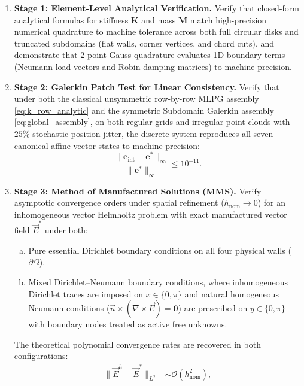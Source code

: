 \documentclass[preprint,12pt]{elsarticle}
\begin{document}
\begin{enumerate}
    \item \textbf{Stage 1: Element-Level Analytical Verification.} Verify that closed-form analytical formulas for stiffness $\mathbf{K}$ and mass $\mathbf{M}$ match high-precision numerical quadrature to machine tolerance across both full circular disks and truncated subdomains (flat walls, corner vertices, and chord cuts), and demonstrate that 2-point Gauss quadrature evaluates 1D boundary terms (Neumann load vectors and Robin damping matrices) to machine precision.
    \item \textbf{Stage 2: Galerkin Patch Test for Linear Consistency.} Verify that under both the classical unsymmetric row-by-row MLPG assembly \eqref{eq:k_row_analytic} and the symmetric Subdomain Galerkin assembly \eqref{eq:global_assembly}, on both regular grids and irregular point clouds with $25\%$ stochastic position jitter, the discrete system reproduces all seven canonical affine vector states to machine precision:
          \begin{equation}
              \frac{\|\mathbf{e}_{\mathrm{int}} - \mathbf{e}^*\|_{\infty}}{\|\mathbf{e}^*\|_{\infty}} \le 10^{-11}.
          \end{equation}
    \item \textbf{Stage 3: Method of Manufactured Solutions (MMS).} Verify asymptotic convergence orders under spatial refinement ($h_{\mathrm{nom}} \to 0$) for an inhomogeneous vector Helmholtz problem with exact manufactured vector field $\vec{E}^*$ under both:
          \begin{enumerate}[(a)]
              \item Pure essential Dirichlet boundary conditions on all four physical walls ($\partial\Omega$).
              \item Mixed Dirichlet--Neumann boundary conditions, where inhomogeneous Dirichlet traces are imposed on $x \in \{0, \pi\}$ and natural homogeneous Neumann conditions ($\vec{n} \times (\nabla \times \vec{E}) = \mathbf{0}$) are prescribed on $y \in \{0, \pi\}$ with boundary nodes treated as active free unknowns.
          \end{enumerate}
          The theoretical polynomial convergence rates are recovered in both configurations:
          \begin{equation}
              \begin{aligned}
                  \|\vec{E}^h - \vec{E}^*\|_{L^2}                                                                       & \sim \mathcal{O}(h_{\mathrm{nom}}^2), \\

\end{aligned}
\end{equation}
\end{enumerate}
\end{document}
